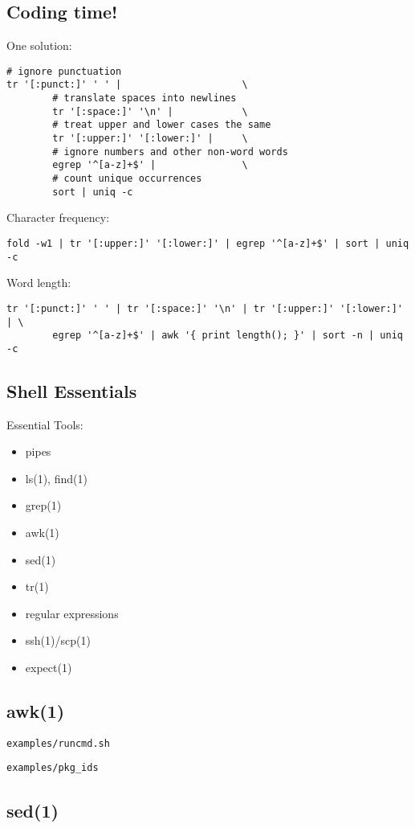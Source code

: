 \documentclass[xga]{xdvislides}
\begin{document}
\subsection{Coding time!}
One solution:
\begin{verbatim}
# ignore punctuation
tr '[:punct:]' ' ' |                     \
        # translate spaces into newlines
        tr '[:space:]' '\n' |            \
        # treat upper and lower cases the same
        tr '[:upper:]' '[:lower:]' |     \
        # ignore numbers and other non-word words
        egrep '^[a-z]+$' |               \
        # count unique occurrences
        sort | uniq -c
\end{verbatim}
Character frequency:
\begin{verbatim}
fold -w1 | tr '[:upper:]' '[:lower:]' | egrep '^[a-z]+$' | sort | uniq -c
\end{verbatim}
Word length:
\begin{verbatim}
tr '[:punct:]' ' ' | tr '[:space:]' '\n' | tr '[:upper:]' '[:lower:]' | \
        egrep '^[a-z]+$' | awk '{ print length(); }' | sort -n | uniq -c
\end{verbatim}


\subsection{Shell Essentials}
Essential Tools:
\begin{itemize}
	\item pipes
	\item ls(1), find(1)
	\item grep(1)
	\item awk(1)
	\item sed(1)
	\item tr(1)
	\item regular expressions
	\item ssh(1)/scp(1)
	\item expect(1)
\end{itemize}

\subsection{awk(1)}
{\tt examples/runcmd.sh}

{\tt examples/pkg\_ids}

\subsection{sed(1)}
\end{document}
